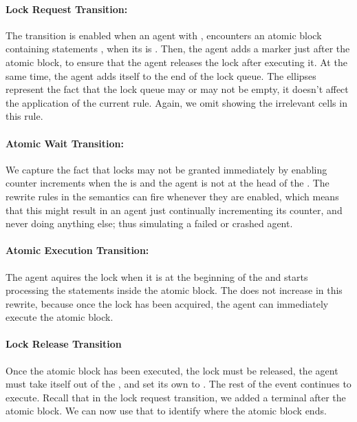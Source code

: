 \paragraph{Lock Request Transition:} The  transition is enabled when an agent with  , encounters an atomic block containing statements , when its  is . Then, the agent adds a marker  just after the atomic block, to ensure that the agent releases the lock after executing it. At the same time, the agent adds itself to the end of the lock queue. The ellipses represent the fact that the lock queue may or may not be empty, it doesn't affect the application of the current rule. Again, we omit showing the irrelevant cells in this rule. 

\paragraph{Atomic Wait Transition:} We capture the fact that locks may not be granted immediately by enabling counter increments when the  is  and the agent  is not at the head of the . The rewrite rules in the semantics can fire whenever they are enabled, which means that this might result in an agent just continually incrementing its counter, and never doing anything else; thus simulating a failed or crashed agent. 

\paragraph{Atomic Execution Transition:} The agent aquires the lock when it is at the beginning of the  and starts processing the statements inside the atomic block. The  does not increase in this rewrite, because once the lock has been acquired, the agent can immediately execute the atomic block. 

\paragraph{Lock Release Transition}
Once the atomic block has been executed, the lock must be released, the agent must take itself out of the , and set its own  to . The rest of the event continues to execute. Recall that in the lock request transition, we added a terminal  after the atomic block. We can now use that to identify where the atomic block ends. 



